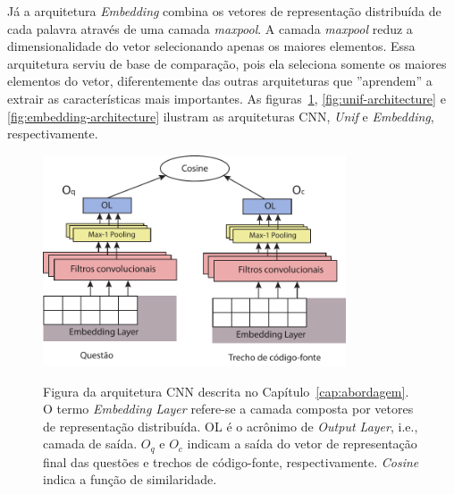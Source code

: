 Já a arquitetura \textit{Embedding} combina os vetores de representação distribuída de cada palavra através de uma camada \textit{maxpool}. A camada \textit{maxpool} reduz a dimensionalidade do vetor selecionando apenas os maiores elementos. Essa arquitetura serviu de base de comparação, pois ela seleciona somente os maiores elementos do vetor, diferentemente das outras arquiteturas que ''aprendem'' a extrair as características mais importantes.  As figuras~\ref{fig:cnn-architecture}, \ref{fig:unif-architecture} e \ref{fig:embedding-architecture} ilustram as arquiteturas CNN, \textit{Unif} e \textit{Embedding}, respectivamente.
\begin{figure}[h]
    \centering
    \caption[Figura da arquitetura CNN descrita no Capítulo~\ref{cap:abordagem}.]{Figura da arquitetura CNN descrita no Capítulo~\ref{cap:abordagem}. O termo \emph{Embedding Layer} refere-se a camada composta por vetores de representação distribuída. OL é o acrônimo de \emph{Output Layer}, i.e., camada de saída. $O_{q}$ e $O_{c}$ indicam a saída do vetor de representação final das questões e trechos de código-fonte, respectivamente. \emph{Cosine} indica a função de similaridade.}
    \includegraphics[width=0.8\textwidth]{figuras/cap-experimento/cnn-architecture-proposal.pdf}
    \label{fig:cnn-architecture}
\end{figure}

